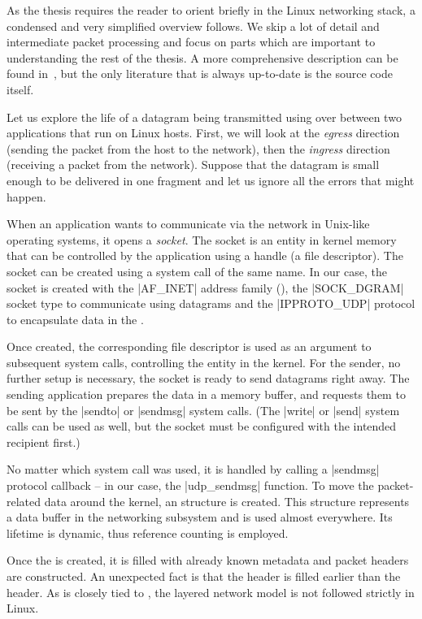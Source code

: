 As the thesis requires the reader to orient briefly in the Linux networking stack,
a condensed and very simplified overview follows. We skip a lot of detail and
intermediate packet processing and focus on parts which are important to
understanding the rest of the thesis. A more comprehensive description can be
found in~\cite{lkn-iat}, but the only literature that is always up-to-date is
the source code itself.

Let us explore the life of a datagram being transmitted using  over
 between two applications that run on Linux hosts. First, we will look
at the \emph{egress} direction (sending the packet from the host to the
network), then the \emph{ingress} direction (receiving a packet from the
network). Suppose that the datagram is small enough to be delivered
in one  fragment and let us ignore all the errors that might happen.

When an application wants to communicate via the network in Unix-like operating
systems, it opens a \emph{socket}. The socket is an entity in kernel memory that
can be controlled by the application using a handle (a file descriptor). The
socket can be created using a system call of
the same name. In our case, the socket is created with the \macro|AF_INET| address
family (), the \macro|SOCK_DGRAM| socket type to communicate using
datagrams and the \macro|IPPROTO_UDP| protocol to encapsulate data in the .

Once created, the corresponding file descriptor is used as an argument to
subsequent system calls, controlling the entity in the kernel. For the sender,
no further setup is necessary, the socket is ready to send datagrams right away.
The sending application prepares the data in a memory buffer, and requests them
to be sent by the \fnc|sendto| or \fnc|sendmsg| system calls. (The \fnc|write|
or \fnc|send| system calls can be used as well, but the socket must be
configured with the intended recipient first.)

No matter which system call was used, it is handled by calling a \fnc|sendmsg|
protocol callback -- in our case, the \fnc|udp_sendmsg| function. To move
the packet-related data around the kernel, an \skb{} structure is created. This
structure represents a data buffer in the networking subsystem and is used
almost everywhere. Its lifetime is dynamic, thus reference counting is
employed.

Once the \skb{} is created, it is filled with already known metadata and packet
headers are constructed. An unexpected fact is that the  header is
filled earlier than the  header. As  is closely tied to
, the layered network model is not followed strictly in Linux.

